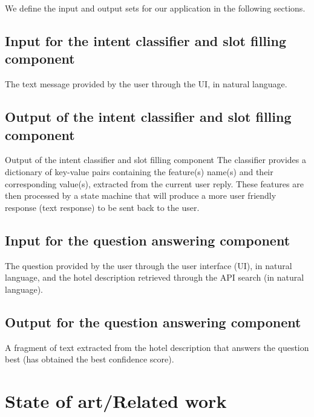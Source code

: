 \documentclass[runningheads,a4paper,11pt]{report}
\begin{document}
We define the input and output sets for our application in the following sections.

\section{Input for the intent classifier and slot filling component}
\label{section:inputClassifier}
The text message provided by the user through the UI, in natural language.
\section{Output of the intent classifier and slot filling component}
\label{section:outputClassifier}
Output of the intent classifier and slot filling component
The classifier provides a dictionary of key-value pairs containing the feature(s) name(s) and their corresponding value(s), extracted from the current user reply. These features are then processed by a state machine that will produce a more user friendly response (text response) to be sent back to the user.

\section{Input for the question answering component}
\label{section:inputQA}
The question provided by the user through the user interface (UI), in natural language, and the hotel description retrieved through the API search (in natural language).
\section{Output for the question answering component}
\label{section:outputQA}
A fragment of text extracted from the hotel description that answers the question best (has obtained the best confidence score).



\chapter{State of art/Related work}
\label{chapter:stateOfArt}
\end{document}
